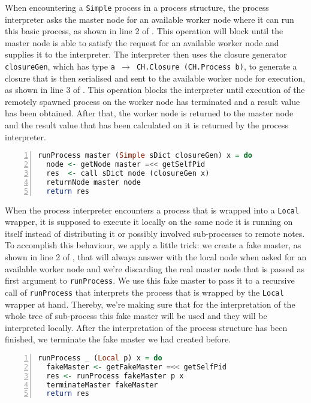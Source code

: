 When encountering a \texttt{Simple} process in a process structure, the process interpreter asks the master node for an available worker node where it can run this basic process, as shown in line 2 of . This operation will block until the master node is able to satisfy the request for an available worker node and supplies it to the interpreter. The interpreter then uses the closure generator \texttt{closureGen}, which has type \texttt{a $\to$ CH.Closure (CH.Process b)}, to generate a closure that is then serialised and sent to the available worker node for execution, as shown in line 3 of . This operation blocks the interpreter until execution of the remotely spawned process on the worker node has terminated and a result value has been obtained. After that, the worker node is returned to the master node and the result value that has been calculated on it is returned by the process interpreter.
\begin{lstlisting}[language=Haskell,caption=Implementation of the interpreter for \texttt{Simple} processes.,label=lst:runprocess_simple,numbers=left,frame=bt]
runProcess master (Simple sDict closureGen) x = do
  node <- getNode master =<< getSelfPid
  res  <- call sDict node (closureGen x)
  returnNode master node
  return res
\end{lstlisting}

When the process interpreter encounters a process that is wrapped into a \texttt{Local} wrapper, it is supposed to execute it locally on the same node it is running on itself instead of distributing it or possibly involved sub-processes to remote notes. To accomplish this behaviour, we apply a little trick: we create a fake master, as shown in line 2 of , that will always answer with the local node when asked for an available worker node and we're discarding the real master node that is passed as first argument to \texttt{runProcess}. We use this fake master to pass it to a recursive call of \texttt{runProcess} that interprets the process that is wrapped by the \texttt{Local} wrapper at hand. Thereby, we're making sure that for the interpretation of the whole tree of sub-process this fake master will be used and they will be interpreted locally. After the interpretation of the process structure has been finished, we terminate the fake master we had created before.
\begin{lstlisting}[language=Haskell,caption=Implementation of the interpreter for \texttt{Local} processes.,label=lst:runprocess_local,numbers=left,frame=bt]
runProcess _ (Local p) x = do
  fakeMaster <- getFakeMaster =<< getSelfPid
  res <- runProcess fakeMaster p x
  terminateMaster fakeMaster
  return res
\end{lstlisting}

